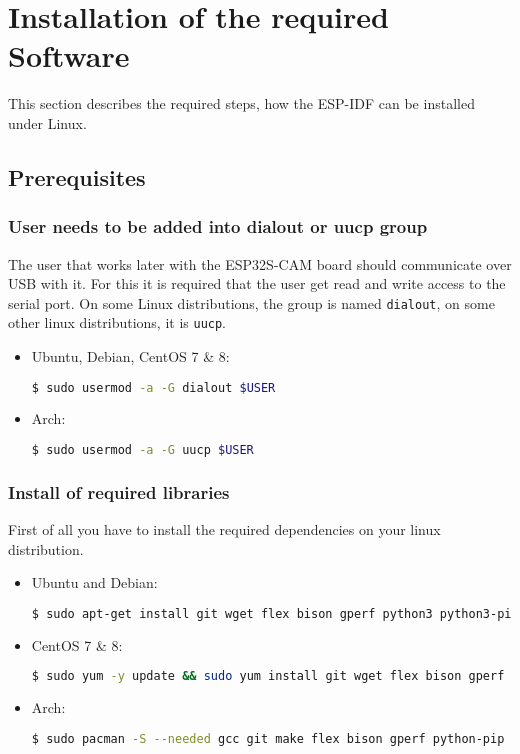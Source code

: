 \section{Installation of the required Software}
This section describes the required steps, how the ESP-IDF can be installed under Linux.


\subsection{Prerequisites}
\subsubsection{User needs to be added into dialout or uucp group}
The user that works later with the ESP32S-CAM board should communicate over USB with it. For this it is required that the user get read and write access to the serial port. On some Linux distributions, the group is named \texttt{dialout}, on some other linux distributions, it is \texttt{uucp}. 
\begin{itemize}
\item Ubuntu, Debian, CentOS 7 \& 8:
\begin{lstlisting}[language=bash]
$ sudo usermod -a -G dialout $USER
\end{lstlisting}
\item Arch:
\begin{lstlisting}[language=bash]
$ sudo usermod -a -G uucp $USER
\end{lstlisting}
\end{itemize} \cite{EspressifEstablishSerialConnectionWithESP32}

\subsubsection{Install of required libraries}
First of all you have to install the required dependencies on your linux distribution.

\begin{itemize}

\item Ubuntu and Debian:
\begin{lstlisting}[language=bash]
$ sudo apt-get install git wget flex bison gperf python3 python3-pip python3-setuptools cmake ninja-build ccache libffi-dev libssl-dev dfu-util libusb-1.0-0
\end{lstlisting}

\item CentOS 7 \& 8:
\begin{lstlisting}[language=bash]
$ sudo yum -y update && sudo yum install git wget flex bison gperf python3 python3-pip python3-setuptools cmake ninja-build ccache dfu-util libusbx
\end{lstlisting}

\item Arch:
\begin{lstlisting}[language=bash]
$ sudo pacman -S --needed gcc git make flex bison gperf python-pip cmake ninja ccache dfu-util libusb
\end{lstlisting}

\end{itemize}

